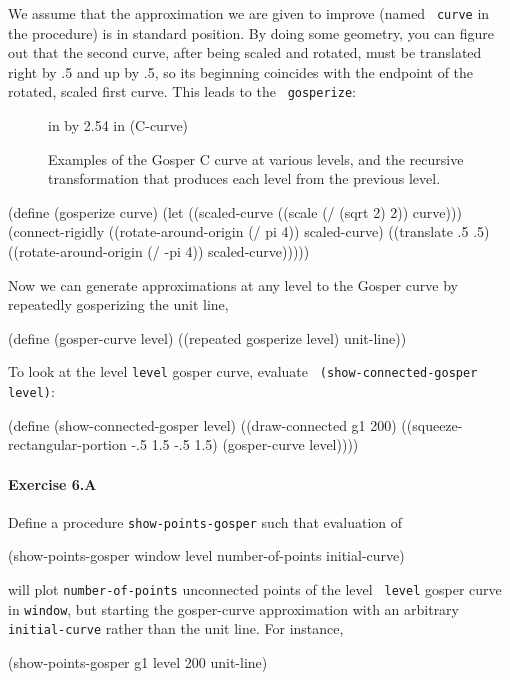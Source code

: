 We assume that the approximation we are given to improve (named {\tt
curve} in the procedure) is in standard position.  By doing some
geometry, you can figure out that the second curve, after being scaled
and rotated, must be translated right by .5 and up by .5, so its beginning
coincides with the endpoint of the rotated, scaled first curve.  This leads
to the \UT\ {\tt gosperize}:


\begin{figure}
 in by 2.54 in (C-curve)
\caption{{\protect\footnotesize
Examples of the Gosper C curve at various levels, and
the recursive transformation that produces each level from the previous
level.}}
\label{Gosper}
\end{figure}

\beginlisp
(define (gosperize curve)
  (let ((scaled-curve ((scale (/ (sqrt 2) 2)) curve)))
    (connect-rigidly ((rotate-around-origin (/ pi 4)) scaled-curve)
                     ((translate .5 .5)
                      ((rotate-around-origin (/ -pi 4)) scaled-curve)))))
\endlisp

Now we can generate approximations at any level to the Gosper curve by
repeatedly gosperizing the unit line,

\beginlisp
(define (gosper-curve level)
    ((repeated gosperize level) unit-line))
\endlisp

To look at the level {\tt level} gosper curve, evaluate {\tt
(show-connected-gosper level)}:

\beginlisp
(define (show-connected-gosper level)
  ((draw-connected g1 200)
   ((squeeze-rectangular-portion -.5 1.5 -.5 1.5)
    (gosper-curve level))))
\endlisp

\paragraph{Exercise 6.A} Define a procedure {\tt show-points-gosper}
such that evaluation of

\beginlisp
(show-points-gosper window level number-of-points initial-curve)
\endlisp

\noindent
will plot {\tt number-of-points} unconnected points of the level {\tt
level} gosper curve in {\tt window}, but starting the gosper-curve
approximation with an arbitrary {\tt initial-curve} rather than the unit
line.  For instance,

\beginlisp
(show-points-gosper g1 level 200 unit-line)
\endlisp

